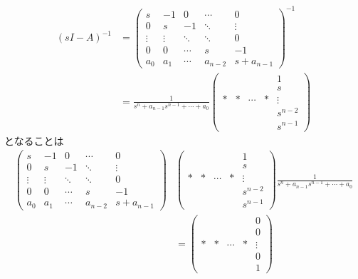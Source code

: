 \documentclass[a4paper,11pt]{jreport}
\begin{document}
\begin{align}
 (sI-A)^{-1}
 &=
    \left(\begin{array}{ccccc}
     s      & -1     &  0     & \cdots &  0 \\
	 0      &  s     & -1     & \ddots &  \vdots \\
	 \vdots & \vdots & \ddots & \ddots &  0 \\
	 0      &  0     & \cdots & s      & -1 \\
	 a_0    &  a_1   & \cdots & a_{n-2}  &  s+a_{n-1}
	\end{array}\right)^{-1}
\nonumber\\
 &=
    \frac{1}{s^n + a_{n-1} s^{n-1}  + \cdots + a_0}
    \left(\begin{array}{ccccc}
        &    &        &    &  1 \\
	    &    &        &    &  s \\
	  * &  * & \cdots &  * &  \vdots \\
	    &    &        &    &  s^{n-2} \\
	    &    &        &    &  s^{n-1}
	\end{array}\right)
\nonumber
\end{align}
となることは
\begin{align}
    \left(\begin{array}{ccccc}
     s      & -1     &  0     & \cdots &  0 \\
	 0      &  s     & -1     & \ddots &  \vdots \\
	 \vdots & \vdots & \ddots & \ddots &  0 \\
	 0      &  0     & \cdots & s      & -1 \\
	 a_0    &  a_1   & \cdots & a_{n-2}  &  s+a_{n-1}
	\end{array}\right)
  &
    \left(\begin{array}{ccccc}
        &    &        &    &  1 \\
	    &    &        &    &  s \\
	  * &  * & \cdots &  * &  \vdots \\
	    &    &        &    &  s^{n-2} \\
	    &    &        &    &  s^{n-1}
	\end{array}\right)
    \frac{1}{s^n + a_{n-1} s^{n-1}  + \cdots + a_0}
\nonumber \\
 &=
    \left(\begin{array}{ccccc}
        &    &        &    &  0 \\
	    &    &        &    &  0 \\
	  * &  * & \cdots &  * &  \vdots \\
	    &    &        &    &  0 \\
	    &    &        &    &  1
	\end{array}\right)
\nonumber
\end{align}
\end{document}
